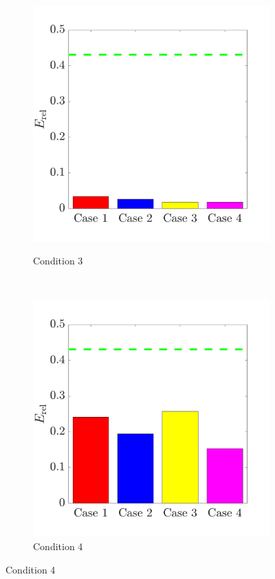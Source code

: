 \documentclass{jov}
\begin{document}
\begin{figure}
\begin{subfigure}{0.22 \textwidth}
	\label{fig:case2Bar}
    \end{subfigure}
    ~ 
        \begin{subfigure}{0.22 \textwidth}
	\caption{Condition 3}
	\includegraphics[width=\textwidth]{../FiguresDraft4/Figure15/Figure15_c.pdf}
	\label{fig:case3Bar}
    \end{subfigure}
    ~ 
        \begin{subfigure}{0.22 \textwidth}
	\caption{Condition 4}
	\includegraphics[width=\textwidth]{../FiguresDraft4/Figure15/Figure15_d.pdf}

\end{subfigure}
\end{figure}
\end{document}
